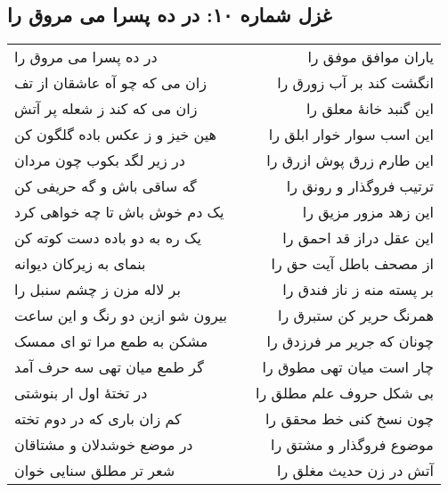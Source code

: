 \begin{center}
\section*{غزل شماره ۱۰: در ده پسرا می مروق را}
\label{sec:010}
\begin{longtable}{l p{0.5cm} r}
در ده پسرا می مروق را
&&
یاران موافق موفق را
\\
زان می که چو آه عاشقان از تف
&&
انگشت کند بر آب زورق را
\\
زان می که کند ز شعله پر آتش
&&
این گنبد خانهٔ معلق را
\\
هین خیز و ز عکس باده گلگون کن
&&
این اسب سوار خوار ابلق را
\\
در زیر لگد بکوب چون مردان
&&
این طارم زرق پوش ازرق را
\\
گه ساقی باش و گه حریفی کن
&&
ترتیب فروگذار و رونق را
\\
یک دم خوش باش تا چه خواهی کرد
&&
این زهد مزور مزیق را
\\
یک ره به دو باده دست کوته کن
&&
این عقل دراز قد احمق را
\\
بنمای به زیرکان دیوانه
&&
از مصحف باطل آیت حق را
\\
بر لاله مزن ز چشم سنبل را
&&
بر پسته منه ز ناز فندق را
\\
بیرون شو ازین دو رنگ و این ساعت
&&
همرنگ حریر کن ستبرق را
\\
مشکن به طمع مرا تو ای ممسک
&&
چونان که جریر مر فرزدق را
\\
گر طمع میان تهی سه حرف آمد
&&
چار است میان تهی مطوق را
\\
در تختهٔ اول ار بنوشتی
&&
بی شکل حروف علم مطلق را
\\
کم زان باری که در دوم تخته
&&
چون نسخ کنی خط محقق را
\\
در موضع خوشدلان و مشتاقان
&&
موضوع فروگذار و مشتق را
\\
شعر تر مطلق سنایی خوان
&&
آتش در زن حدیث مغلق را
\\
\end{longtable}
\end{center}

